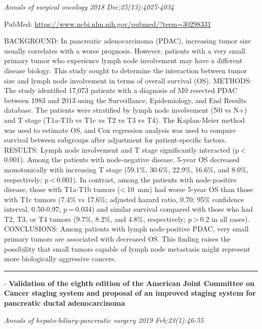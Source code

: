 \documentclass[]{article}
\begin{document}
\emph{Annals of surgical oncology 2018 Dec;25(13):4027-4034}

PubMed: \url{https://www.ncbi.nlm.nih.gov/pubmed/?term=30298331}

BACKGROUND: In pancreatic adenocarcinoma (PDAC), increasing tumor size
usually correlates with a worse prognosis. However, patients with a very
small primary tumor who experience lymph node involvement may have a
different disease biology. This study sought to determine the
interaction between tumor size and lymph node involvement in terms of
overall survival (OS). METHODS: The study identified 17,073 patients
with a diagnosis of M0 resected PDAC between 1983 and 2013 using the
Surveillance, Epidemiology, and End Results database. The patients were
stratified by lymph node involvement (N0 vs N+) and T stage (T1a-T1b vs
T1c vs T2 vs T3 vs T4). The Kaplan-Meier method was used to estimate OS,
and Cox regression analysis was used to compare survival between
subgroups after adjustment for patient-specific factors. RESULTS: Lymph
node involvement and T stage significantly interacted
(p \textless{} 0.001). Among the patients with node-negative disease,
5-year OS decreased monotonically with increasing T stage (59.1\%,
30.6\%, 22.9\%, 16.6\%, and 8.0\%, respectively; p \textless{} 0.001).
In contrast, among the patients with node-positive disease, those with
T1a-T1b tumors (\textless{} 10~mm) had worse 5-year OS than those with
T1c tumors (7.4\% vs 17.6\%; adjusted hazard ratio, 0.70; 95\%
confidence interval, 0.50-0.97; p = 0.034) and similar survival compared
with those who had T2, T3, or T4 tumors (9.7\%, 8.2\%, and 4.8\%,
respectively; p \textgreater{} 0.2 in all cases). CONCLUSIONS: Among
patients with lymph node-positive PDAC, very small primary tumors are
associated with decreased OS. This finding raises the possibility that
small tumors capable of lymph node metastasis might represent more
biologically aggressive cancers.

{}

{}

\begin{center}\rule{0.5\linewidth}{\linethickness}\end{center}

 - \textbf{Validation of the eighth edition of the American Joint
Committee on Cancer staging system and proposal of an improved staging
system for pancreatic ductal adenocarcinoma}

\emph{Annals of hepato-biliary-pancreatic surgery 2019 Feb;23(1):46-55}
\end{document}
